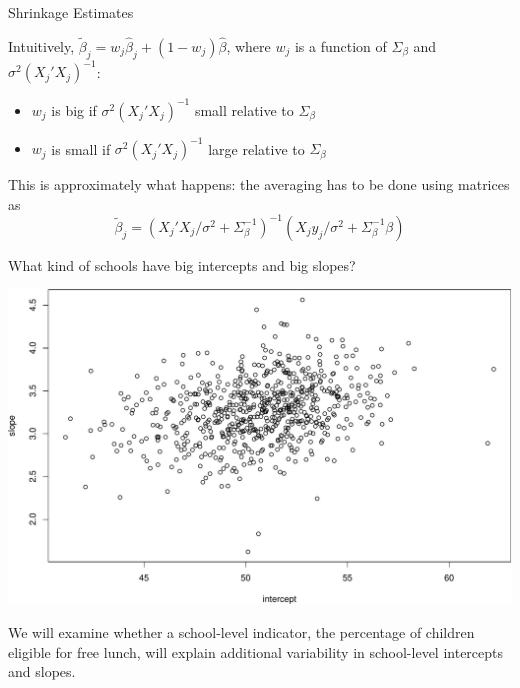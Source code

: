 \documentclass[ignorenonframetext,]{beamer}
\providecommand{\tightlist}{%
  \setlength{\itemsep}{0pt}\setlength{\parskip}{0pt}}
\begin{document}
\begin{frame}{Shrinkage Estimates}

Intuitively,
\(\widetilde{\beta}_j=w_j\widehat{\beta}_j+(1-w_j)\widehat{\beta}\),
where \(w_j\) is a function of \(\Sigma_\beta\) and
\(\sigma^2(X_j'X_j)^{-1}\):

\begin{itemize}
\tightlist
\item
  \(w_j\) is big if \(\sigma^2(X_j'X_j)^{-1}\) small relative to
  \(\Sigma_\beta\)
\item
  \(w_j\) is small if \(\sigma^2(X_j'X_j)^{-1}\) large relative to
  \(\Sigma_\beta\)
\end{itemize}

This is approximately what happens: the averaging has to be done using
matrices as
\[\widetilde{\beta}_j=\left(X_j'X_j/\sigma^2 + \Sigma_\beta^{-1}\right)^{-1}\left(X_jy_j/\sigma^2+\Sigma_\beta^{-1}\beta \right)\]

\end{frame}

\begin{frame}{What kind of schools have big intercepts and big slopes?}

\includegraphics{ancova_01_deck_files/figure-beamer/plotintslope-1.pdf}

We will examine whether a school-level indicator, the percentage of
children eligible for free lunch, will explain additional variability in
school-level intercepts and slopes.

\end{frame}
\end{document}
